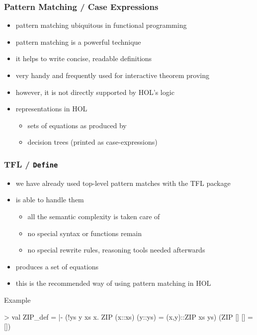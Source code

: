 \begin{frame}
\frametitle{Pattern Matching / Case Expressions}

\begin{itemize}
\item pattern matching ubiquitous in functional programming
\item pattern matching is a powerful technique
\item it helps to write concise, readable definitions
\item very handy and frequently used for interactive theorem proving
\item however, it is \alert{not directly supported} by HOL's logic
\item representations in HOL
\begin{itemize}
\item sets of equations as produced by 
\item decision trees (printed as case-expressions)
\end{itemize}
\end{itemize}
\end{frame}


\begin{frame}[fragile]
\frametitle{TFL / \texttt{Define}}

\begin{itemize}
\item we have already used top-level pattern matches with the TFL package
\item {} is able to handle them
\begin{itemize}
\item all the semantic complexity is taken care of
\item no special syntax or functions remain
\item no special rewrite rules, reasoning tools needed afterwards
\end{itemize}
\item {} produces a set of equations
\item this is the recommended way of using pattern matching in HOL
\end{itemize}

\begin{exampleblock}{Example}
\begin{semiverbatim}\scriptsize
> 
val ZIP_def = |- (!ys y xs x. ZIP (x::xs) (y::ys) = (x,y)::ZIP xs ys) \holAnd{}
                 (ZIP [] [] = [])
\end{semiverbatim}
\end{exampleblock}
\end{frame}


